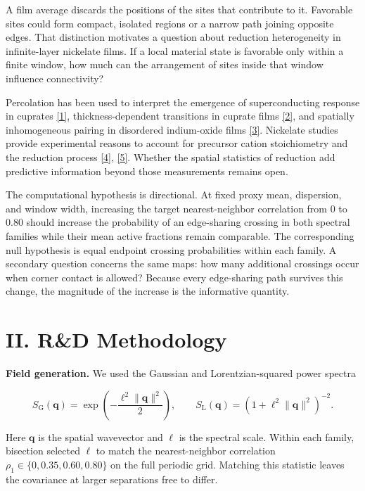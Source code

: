 \documentclass[11pt]{article}
\begin{document}
A film average discards the positions of the sites that contribute to it. Favorable sites could form compact, isolated regions or a narrow path joining opposite edges. That distinction motivates a question about reduction heterogeneity in infinite-layer nickelate films. If a local material state is favorable only within a finite window, how much can the arrangement of sites inside that window influence connectivity?

Percolation has been used to interpret the emergence of superconducting response in cuprates \href{https://doi.org/10.1038/s41467-018-06707-y}{[1]}, thickness-dependent transitions in cuprate films \href{https://doi.org/10.1038/s41598-020-60037-y}{[2]}, and spatially inhomogeneous pairing in disordered indium-oxide films \href{https://doi.org/10.1103/PhysRevB.78.014506}{[3]}. Nickelate studies provide experimental reasons to account for precursor cation stoichiometry and the reduction process \href{https://doi.org/10.3389/fphy.2021.719534}{[4]}, \href{https://doi.org/10.1002/advs.202309092}{[5]}. Whether the spatial statistics of reduction add predictive information beyond those measurements remains open.

The computational hypothesis is directional. At fixed proxy mean, dispersion, and window width, increasing the target nearest-neighbor correlation from 0 to 0.80 should increase the probability of an edge-sharing crossing in both spectral families while their mean active fractions remain comparable. The corresponding null hypothesis is equal endpoint crossing probabilities within each family. A secondary question concerns the same maps: how many additional crossings occur when corner contact is allowed? Because every edge-sharing path survives this change, the magnitude of the increase is the informative quantity.

\section*{II. R\&D Methodology}

\textbf{Field generation.} We used the Gaussian and Lorentzian-squared power spectra

\[
S_{\mathrm G}(\mathbf q)=\exp\!\left(-\frac{\ell^2\lVert\mathbf q\rVert^2}{2}\right),\qquad
S_{\mathrm L}(\mathbf q)=\left(1+\ell^2\lVert\mathbf q\rVert^2\right)^{-2}.
\]

Here $\mathbf q$ is the spatial wavevector and $\ell$ is the spectral scale. Within each family, bisection selected $\ell$ to match the nearest-neighbor correlation $\rho_1\in\{0,0.35,0.60,0.80\}$ on the full periodic grid. Matching this statistic leaves the covariance at larger separations free to differ.
\end{document}
